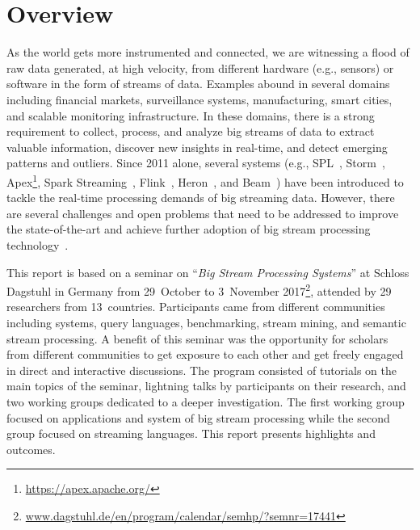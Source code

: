 \section{Overview}\label{sec:overview}

As the world gets more instrumented and connected, we are witnessing a
flood of raw data generated, at high velocity,
from different hardware (e.g., sensors) or software in the form of
streams of data. Examples abound in several
domains including financial markets, surveillance
systems, manufacturing, smart cities, and scalable monitoring
infrastructure. In these domains, there is a strong
requirement to collect, process, and analyze big streams of data
to extract valuable information, discover new insights in
real-time, and detect emerging patterns and outliers. Since 2011
alone, several systems (e.g.,
\textsf{\small SPL}~\cite{hirzel_schneider_gedik_2017},
\textsf{\small Storm}~\cite{toshniwal_et_al_2014},
\textsf{\small Apex}\footnote{\url{https://apex.apache.org/}},
\textsf{\small Spark Streaming}~\cite{zaharia_et_al_2013},
\textsf{\small Flink}~\cite{carbone_et_al_2015},
\textsf{\small Heron}~\cite{kulkarni_et_al_2015}, and
\textsf{\small Beam}~\cite{akidau2015dataflow}) have
been introduced to tackle the real-time processing demands of big
streaming data. However, there are several challenges and open
problems that need to be addressed to improve the state-of-the-art
and achieve further adoption of big stream processing
technology~\cite{sakr2016big}.

This report is based on a seminar on ``\emph{Big Stream
  Processing Systems}'' at Schloss Dagstuhl in Germany
from 29~October to 3~November 2017\footnote{\url{www.dagstuhl.de/en/program/calendar/semhp/?semnr=17441}},
%
attended by 29 researchers from 13~countries.
Participants came from different communities including systems, query
languages, benchmarking, stream mining, and semantic stream
processing. A benefit of this seminar was the opportunity for scholars
from different communities to get exposure to each other and get
freely engaged in direct and interactive discussions. The program
consisted of tutorials on the main topics of the seminar, lightning
talks by participants on their research, and two working groups
dedicated to a deeper investigation.  The first working
group focused on applications and system of big stream processing
while the second group focused on 
streaming languages. This report presents highlights and outcomes.
